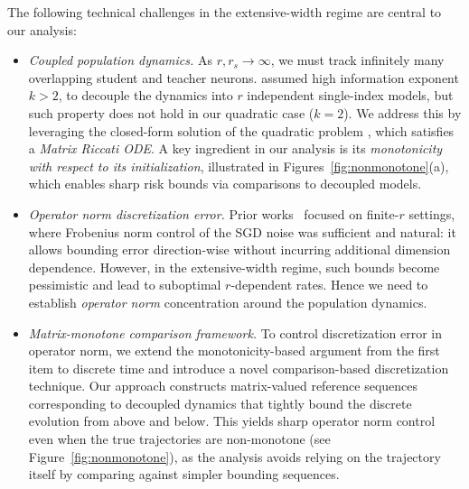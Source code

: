 The following technical challenges in the extensive-width regime are central to our analysis:  
\begin{itemize}[leftmargin=*,topsep=0.75mm]
\item \textit{Coupled population dynamics.} As $r, r_s \to \infty$, we must track infinitely many overlapping student and teacher neurons. \cite{oko2024learning,simsek2024learning} assumed high information exponent $k > 2$, to decouple the dynamics into $r$ independent single-index models, but such property does not hold in our quadratic case ($k = 2$). We address this by leveraging the closed-form solution of the quadratic problem \cite{martin2023impact}, which satisfies a \textit{Matrix Riccati ODE}. A key ingredient in our analysis is its \textit{monotonicity with respect to its initialization}, illustrated in Figures~\ref{fig:nonmonotone}(a),  which enables sharp risk bounds via comparisons to decoupled models.
\item \textit{Operator norm discretization error.} Prior works~\cite{benarous2021online, bietti2023learning, arous2024high} focused on finite-$r$ settings, where Frobenius norm control of the SGD noise was sufficient and natural: it allows bounding error direction-wise without incurring additional dimension dependence. However, in the extensive-width regime, such bounds become pessimistic and lead to suboptimal $r$-dependent rates. Hence we need to establish \emph{operator norm} concentration around the population dynamics.
\item \textit{Matrix-monotone comparison framework.}  
To control discretization error in operator norm, we extend the monotonicity-based argument from the first item to discrete time and introduce a novel comparison-based discretization technique. Our approach constructs matrix-valued reference sequences corresponding to decoupled dynamics that tightly bound the discrete evolution from above and below. This yields sharp operator norm control even when the true trajectories are non-monotone (see Figure~\ref{fig:nonmonotone}), as the analysis avoids relying on the trajectory itself by comparing against simpler bounding sequences.  
\end{itemize}



